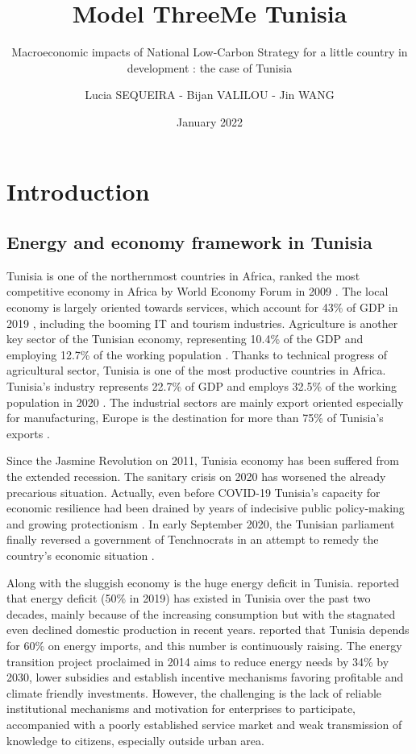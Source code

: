 \documentclass[
]{article}
\title{Model ThreeMe Tunisia}
\subtitle{Macroeconomic impacts of National Low-Carbon Strategy for a
little country in development : the case of Tunisia}
\author{Lucia SEQUEIRA - Bijan VALILOU - Jin WANG}
\date{January 2022}
\begin{document}
\maketitle

{
\setcounter{tocdepth}{4}
\tableofcontents
}
\newpage

\hypertarget{introduction}{%
\section{Introduction}\label{introduction}}

\hypertarget{energy-and-economy-framework-in-tunisia}{%
\subsection{Energy and economy framework in
Tunisia}\label{energy-and-economy-framework-in-tunisia}}

Tunisia is one of the northernmost countries in Africa, ranked the most
competitive economy in Africa by World Economy Forum in 2009
\autocite{tunisia2022}. The local economy is largely oriented towards
services, which account for 43\% of GDP in 2019
\autocite{worldbank2020}, including the booming IT and tourism
industries. Agriculture is another key sector of the Tunisian economy,
representing 10.4\% of the GDP and employing 12.7\% of the working
population \autocite{worldbank2020}. Thanks to technical progress of
agricultural sector, Tunisia is one of the most productive countries in
Africa. Tunisia's industry represents 22.7\% of GDP and employs 32.5\%
of the working population in 2020 \autocite{bnpparibas}. The industrial
sectors are mainly export oriented especially for manufacturing, Europe
is the destination for more than 75\% of Tunisia's exports
\autocite{worldbank2020}.

Since the Jasmine Revolution on 2011, Tunisia economy has been suffered
from the extended recession. The sanitary crisis on 2020 has worsened
the already precarious situation. Actually, even before COVID-19
Tunisia's capacity for economic resilience had been drained by years of
indecisive public policy-making and growing protectionism
\autocite{worldbank}. In early September 2020, the Tunisian parliament
finally reversed a government of Tenchnocrats in an attempt to remedy
the country's economic situation \autocite{bnpparibas}.

Along with the sluggish economy is the huge energy deficit in Tunisia.
\textcite{irena2021} reported that energy deficit (50\% in 2019) has
existed in Tunisia over the past two decades, mainly because of the
increasing consumption but with the stagnated even declined domestic
production in recent years. \textcite{giz} reported that Tunisia depends
for 60\% on energy imports, and this number is continuously raising. The
energy transition project proclaimed in 2014 aims to reduce energy needs
by 34\% by 2030, lower subsidies and establish incentive mechanisms
favoring profitable and climate friendly investments. However, the
challenging is the lack of reliable institutional mechanisms and
motivation for enterprises to participate, accompanied with a poorly
established service market and weak transmission of knowledge to
citizens, especially outside urban area.
\end{document}
